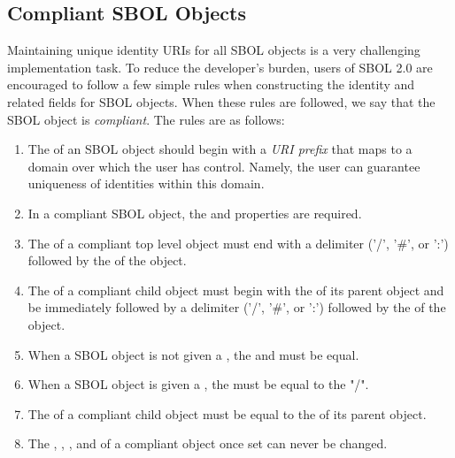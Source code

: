 
\subsection{Compliant SBOL Objects}
\label{sec:compliant}

Maintaining unique identity URIs for all SBOL objects is a very challenging implementation task.  To reduce the developer's burden, users of SBOL 2.0 are encouraged to follow a few simple rules when constructing the identity and related fields for SBOL objects.  When these rules are followed, we say that the SBOL object is \emph{compliant}.  The rules are as follows:
\begin{enumerate}
\item The  of an SBOL object should begin with a \emph{URI prefix} that maps to a domain over which the user has control.  Namely, the user can guarantee uniqueness of identities within this domain.
\item In a compliant SBOL object, the  and  properties are required.
\item The  of a compliant top level object must end with a delimiter ('/', '\#', or ':') followed by the  of the object. 
\item The  of a compliant child object must begin with the  of its parent object and be immediately followed by a delimiter ('/', '\#', or ':') followed by the  of the object.
\item When a SBOL object is not given a , the  and  must be equal.
\item When a SBOL object is given a , the  must be equal to the "/".
\item The  of a compliant child object must be equal to the  of its parent object.
\item The , , , and  of a compliant object once set can never be changed.
\end{enumerate}

